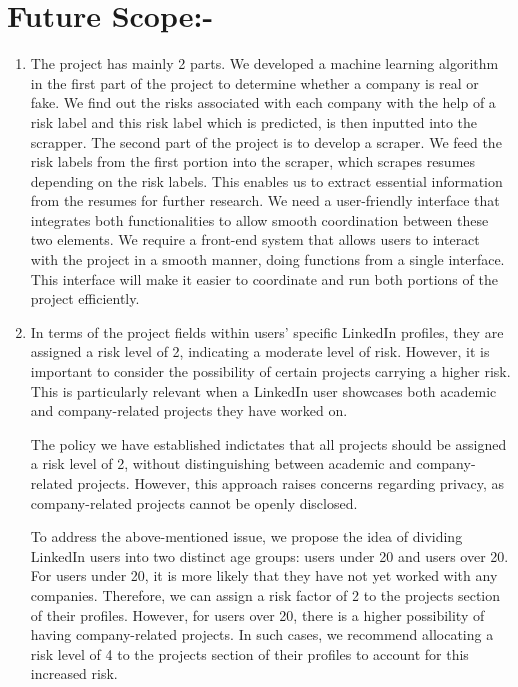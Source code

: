 \documentclass{article}
\begin{document}
\section{Future Scope:-}
\begin{enumerate}
  \item The project has mainly 2 parts.
We developed a machine learning algorithm in the first part of the project to determine whether a company is real or fake. We find out the risks associated with each company with the help of a risk label and this risk label which is predicted, is then inputted into the scrapper.
The second part  of the project is to develop a scraper. We feed the risk labels from the first portion into the scraper, which scrapes resumes depending on the risk labels. This enables us to extract essential information from the resumes for further research.
We need a user-friendly interface that integrates both functionalities to allow smooth coordination between these two elements. We require a front-end system that allows users to interact with the project in a smooth manner, doing functions from a single interface. This interface will make it easier to coordinate and run both portions of the project efficiently.

  \item In terms of the project fields within users' specific LinkedIn profiles, they are assigned a risk level of 2, indicating a moderate level of risk. However, it is important to consider the possibility of certain projects carrying a higher risk. This is particularly relevant when a LinkedIn user showcases both academic and company-related projects they have worked on.

The policy we have established indictates that all projects should be assigned a risk level of 2, without distinguishing between academic and company-related projects. However, this approach raises concerns regarding privacy, as company-related projects cannot be openly disclosed.

To address the above-mentioned issue, we propose the idea of  dividing LinkedIn users into two distinct age groups: users under 20 and users over 20. For users under 20, it is more likely that they have not yet worked with any companies. Therefore, we can assign a risk factor of 2 to the projects section of their profiles. However, for users over 20, there is a higher possibility of having company-related projects. In such cases, we recommend allocating a risk level of 4 to the projects section of their profiles to account for this increased risk.

\end{enumerate}
\end{document}
